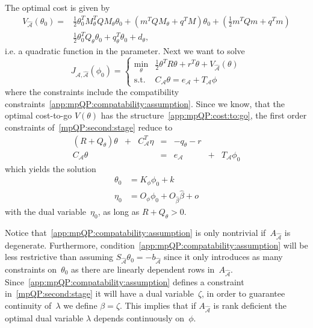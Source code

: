 The optimal cost is given by
%
\begin{equation}\label{app:mpQP:cost:to:go}\begin{split}
	V_{\hat{\mathcal A}}(\theta_0) = &\frac{1}{2}\theta^T_0 M_\theta^T Q M_\theta \theta_0 + \left(m^TQM_\theta + q^TM\right) \theta_0 + 
	\left( \frac{1}{2} m^T Q m + q^T m\right)\\
	&\frac{1}{2} \theta^T_0 Q_\theta \theta_0 + q^T_\theta \theta_0 + d_\theta,
\end{split}\end{equation}
%
i.e. a quadratic function in the parameter.
%
Next we want to solve
%
\begin{equation}\label{mpQP:second:stage}
	J_{\mathcal A,\hat{\mathcal A}}(\phi_0) = \left\{\begin{array}{rl}
	\min_\theta & \frac{1}{2}\theta^TR\theta + r^T\theta + V_{\hat{\mathcal A}}(\theta)\\
	\text{s.t.} & C_{\mathcal A}\theta = e_{\mathcal A} + T_{\mathcal A} \phi
	\end{array}\right.
\end{equation}
%
where the constraints include the compatibility constraints~\eqref{app:mpQP:compatability:assumption}. 
%
Since we know, that the optimal cost-to-go $V(\theta)$ has the structure~\eqref{app:mpQP:cost:to:go},
the first order constraints of~\eqref{mpQP:second:stage} reduce to
%
\begin{equation}\label{mpQP:second:stage:conditions}
	\begin{array}{ccccccc}
		(R + Q_\theta)\theta &+& C^T_{{\mathcal A}}\eta & = & -q_\theta-r && \\
		C_{{\mathcal A}} \theta & & & = & e_{{\mathcal A}}& +& T_{{\mathcal A}}\phi_0
	\end{array}
\end{equation}
%
which yields the solution
%
\begin{equation}
	\begin{split}
	\theta_0 &= K_\phi \phi_0 + k\\
	\eta_0 &= O_\phi \phi_0 + O_{\hat\beta} \hat\beta + o
	\end{split}
\end{equation}
%
with the dual variable~$\eta_0$, as long as $R+Q_\theta>0$.

Notice that~\eqref{app:mpQP:compatability:assumption} is only nontrivial if~$A_{\hat{\mathcal A}}$ is degenerate.
%
Furthermore, condition~\eqref{app:mpQP:compatability:assumption} will be less restrictive than assuming 
$S_{\hat{\mathcal A}}\theta_0=-b_{\hat{\mathcal A}}$ since it only introduces as many constraints on~$\theta_0$ 
as there are linearly dependent rows in~$A_{\hat{\mathcal A}}$.
%
Since~\eqref{app:mpQP:compatability:assumption} defines a constraint in~\eqref{mpQP:second:stage} it will have a dual
variable~$\zeta$, in order to guarantee continuity of~$\lambda$ we define $\beta=\zeta$.
%
This implies that if $A_{\hat{\mathcal A}}$ is rank deficient the optimal dual variable $\lambda$
depends continuously on~$\phi$.

